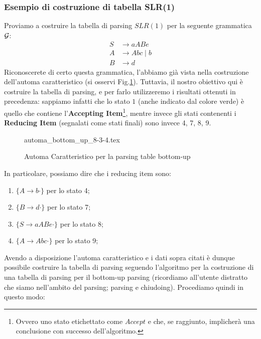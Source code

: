 \documentclass[class=book, crop=false, oneside, 12pt]{standalone}
\begin{document}
\subsubsection{Esempio di costruzione di tabella SLR(1)}
Proviamo a costruire la tabella di parsing \(SLR(1)\) per la seguente grammatica \(\mathcal{G}\):
\begin{align*}
    S &\rightarrow aABe \\
    A &\rightarrow Abc \mid b \\
    B &\rightarrow d
\end{align*}
Riconoscerete di certo questa grammatica, l'abbiamo già vista nella costruzione dell'automa caratteristico (si osservi Fig.\ref{fig:charateristic-automata-complete}). Tuttavia, il nostro obiettivo qui è costruire la tabella di parsing, e per farlo utilizzeremo i risultati ottenuti in precedenza: sappiamo infatti che lo stato \(1\) (anche indicato dal colore verde) è quello che contiene l'\textbf{Accepting Item}\footnote{Ovvero uno stato etichettato come \(Accept\) e che, se raggiunto, implicherà una conclusione con successo dell'algoritmo.}, mentre invece gli stati contenenti i \textbf{Reducing Item} (segnalati come stati finali) sono invece 4, 7, 8, 9. 
\begin{figure}[H]
    \centering
	{automa_bottom_up_8-3-4.tex}
    \caption{Automa Caratteristico per la parsing table bottom-up}
    \label{fig:charateristic-automata-complete}    
\end{figure}
In particolare, possiamo dire che i reducing item sono:
\begin{enumerate}
    \item \(\{A \rightarrow b \cdot\}\) per lo stato 4;
    \item \(\{B \rightarrow d \cdot\}\) per lo stato 7;
    \item \(\{S \rightarrow aABe \cdot\}\) per lo stato 8;
    \item \(\{A \rightarrow Abc \cdot\}\) per lo stato 9;
\end{enumerate}
Avendo a disposizione l'automa caratteristico e i dati sopra citati è dunque possibile costruire la tabella di parsing seguendo l'algoritmo per la costruzione di una tabella di parsing per il bottom-up parsing (ricordiamo all'utente distratto che siamo nell'ambito del parsing; parsing e chiudoing). Procediamo quindi in questo modo:
\end{document}
